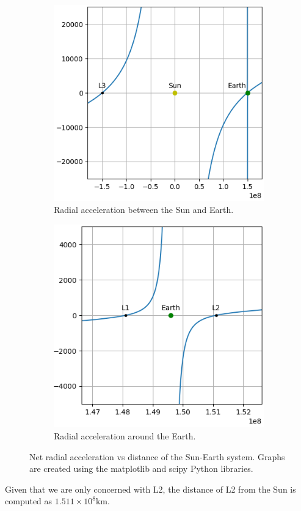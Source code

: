 \begin{figure}[H]
	\centering
	\captionsetup[subfigure]{justification=centering}
	\begin{subfigure}[b]{0.4\textwidth}
		\centering
		\includegraphics[scale=0.6]{r-accel-figure-1.png}
		\caption{\footnotesize Radial acceleration between the Sun and Earth.}
		\label{fig:radial-accel-system}
	\end{subfigure}
	\hspace*{1cm}
	\begin{subfigure}[b]{0.4\textwidth}
		\centering
		\includegraphics[scale=0.6]{r-accel-figure-2.png}
		\caption{\footnotesize Radial acceleration around the Earth.\vspace*{1.16em}}
		\label{fig:radial-accel-earth}
	\end{subfigure}
	\label{fig:radial-accel}
	\caption{Net radial acceleration vs distance of the Sun-Earth system. Graphs are created using the matplotlib and scipy Python libraries.}
\end{figure}
Given that we are only concerned with L2, the distance of L2 from the Sun is computed as $1.511 \times 10^8 \si{\kilo\metre}$.

